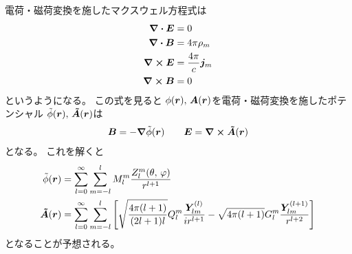 \documentclass[../../master.tex]{subfiles}
\begin{document}
電荷・磁荷変換を施したマクスウェル方程式は
\begin{align}
    \div \vb*{E} &= 0\\
    \div \vb*{B} &= 4\pi \rho_m\\
    \curl \vb*{E} &= \frac{4\pi}{c}\vb*{j}_m\\
    \curl \vb*{B} &= 0
\end{align}
というようになる。
この式を見ると
\(\phi(\vb*{r}),\,\vb*{A}(\vb*{r})\)を電荷・磁荷変換を施したポテンシャル
\(\tilde{\phi}(\vb*{r}),\,\vb*{\tilde{A}}(\vb*{r})\)は
\begin{align}
    \vb*{B} = -\grad{\tilde{\phi}(\vb*{r})} \qquad
    \vb*{E} = \curl \vb*{\tilde{A}}(\vb*{r})
\end{align}
となる。
これを解くと
\begin{align}
    \tilde{\phi}(\vb*{r})
    &= \sum_{l=0}^{\infty} \sum_{m=-l}^{l} M_l^m \frac{Z_l^m(\theta,\,\varphi)}{r^{l+1}}\\
    \vb*{\tilde{A}}(\vb*{r})
    &= \sum_{l=0}^{\infty} \sum_{m=-l}^{l}\qty[
        \sqrt{\frac{4\pi(l+1)}{(2l+1)l}}Q_l^m \frac{\vb*{Y}_{lm}^{(l)}}{ir^{l+1}}
        -\sqrt{4\pi(l+1)} G_l^m \frac{\vb*{Y}_{lm}^{(l+1)}}{r^{l+2}}
    ]
\end{align}
となることが予想される。
\end{document}
